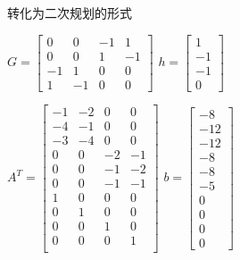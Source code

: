 \documentclass[12pt]{article}
\begin{document}
	          转化为二次规划的形式
	          \vspace{5pt}
	          
	          \begin{center}
	          	
	          	$G = \begin{bmatrix}
	          	0 & 0 & -1 & 1 \\
	          	0 & 0 & 1 & -1 \\
	          	-1 & 1 & 0 & 0 \\
	          	1 & -1 & 0 & 0 
	          	\end{bmatrix}$ \qquad
	          	$h = \begin{bmatrix}
	          	1 \\ -1 \\ -1 \\ 0
	          	\end{bmatrix}$
	          	\vspace{10pt}
	
	          	$A^T = \begin{bmatrix}
	          	-1 & -2 & 0 & 0 \\
	          	-4 & -1 & 0 & 0 \\
	          	-3 & -4 & 0 & 0 \\
	          	0 & 0 & -2 & -1 \\
	          	0 & 0 & -1 & -2 \\
	          	0 & 0 & -1 & -1 \\
	          	1 & 0 & 0 & 0 \\
	          	0 & 1 & 0 & 0 \\
	          	0 & 0 & 1 & 0 \\
	          	0 & 0 & 0 & 1 \\
	          	\end{bmatrix}$ \qquad
	          	$b = \begin{bmatrix}
	          	-8 \\ -12 \\ -12 \\ -8 \\ -8 \\ -5 \\ 0 \\ 0 \\ 0 \\ 0
	          	\end{bmatrix}$
	          \end{center}
	          \vspace{5pt}
	          
\end{document}
